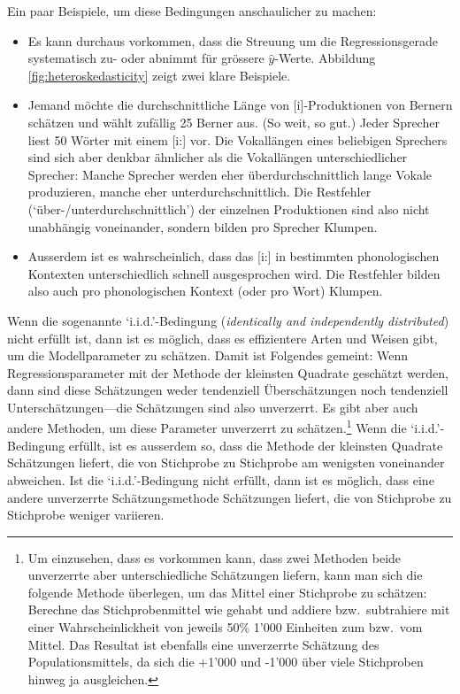 \documentclass[oneside, 10pt]{book}\usepackage[]{graphicx}\usepackage[]{xcolor}
\begin{document}
 Ein paar Beispiele, um diese Bedingungen anschaulicher zu machen:
 \begin{itemize}
 \item Es kann durchaus vorkommen, dass die Streuung um die Regressionsgerade
 systematisch zu- oder abnimmt für grössere $\widehat{y}$-Werte. Abbildung
 \vref{fig:heteroskedasticity} zeigt zwei klare Beispiele.

 \item Jemand möchte die durchschnittliche Länge von [i]-Produktionen
 von Bernern schätzen und wählt zufällig 25 Berner aus. (So weit, so gut.)
 Jeder Sprecher liest 50 Wörter mit einem [i:] vor.
 Die Vokallängen eines beliebigen Sprechers sind sich aber denkbar ähnlicher
 als die Vokallängen unterschiedlicher Sprecher: Manche Sprecher werden
 eher überdurchschnittlich lange Vokale produzieren, manche eher unterdurchschnittlich.
 Die Restfehler (`über-/unterdurchschnittlich') der einzelnen Produktionen
 sind also nicht unabhängig voneinander, sondern bilden pro Sprecher Klumpen.

 \item Ausserdem ist es wahrscheinlich, dass das [i:] in bestimmten
 phonologischen Kontexten unterschiedlich schnell ausgesprochen wird. Die
 Restfehler bilden also auch pro phonologischen Kontext (oder pro Wort) Klumpen.
 \end{itemize}

 Wenn die sogenannte `i.i.d.'-Bedingung (\textit{identically and independently distributed})
 nicht erfüllt ist, dann ist es möglich, dass es effizientere
 Arten und Weisen gibt, um die Modellparameter zu schätzen.
 Damit ist Folgendes gemeint: Wenn Regressionsparameter mit
 der Methode der kleinsten Quadrate geschätzt werden, dann
 sind diese Schätzungen weder tendenziell Überschätzungen
 noch tendenziell Unterschätzungen---die Schätzungen
 sind also unverzerrt. Es gibt aber auch andere Methoden,
 um diese Parameter unverzerrt zu schätzen.\footnote{Um einzusehen, dass es
 vorkommen kann, dass zwei Methoden beide unverzerrte aber unterschiedliche Schätzungen
 liefern, kann man sich die folgende Methode überlegen, um das Mittel einer Stichprobe
 zu schätzen: Berechne das Stichprobenmittel wie gehabt und addiere bzw.\ subtrahiere
 mit einer Wahrscheinlickheit von jeweils 50\% 1'000 Einheiten zum bzw.\ vom Mittel.
 Das Resultat ist ebenfalls eine unverzerrte Schätzung des Populationsmittels,
 da sich die +1'000 und -1'000 über viele Stichproben hinweg ja ausgleichen.}
 Wenn die `i.i.d.'-Bedingung erfüllt, ist es ausserdem so,
 dass die Methode der kleinsten Quadrate Schätzungen liefert,
 die von Stichprobe zu Stichprobe am wenigsten voneinander
 abweichen. Ist die `i.i.d.'-Bedingung nicht erfüllt,
 dann ist es möglich, dass eine andere unverzerrte Schätzungsmethode
 Schätzungen liefert, die von Stichprobe zu Stichprobe weniger
 variieren.
\end{document}
